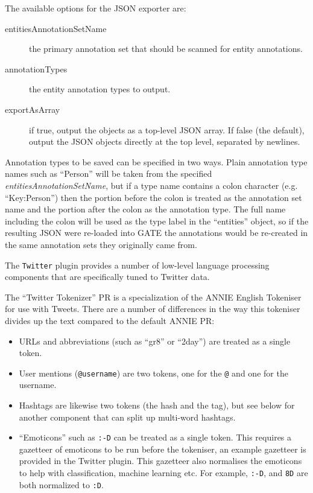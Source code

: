 The available options for the JSON exporter are:
\begin{description}
\item[entitiesAnnotationSetName] the primary annotation set that should be
  scanned for entity annotations.
\item[annotationTypes] the entity annotation types to output.
\item[exportAsArray] if true, output the objects as a top-level JSON array.  If
  false (the default), output the JSON objects directly at the top level,
  separated by newlines.
\end{description}

Annotation types to be saved can be specified in two ways.  Plain annotation
type names such as ``Person'' will be taken from the specified
\emph{entitiesAnnotationSetName}, but if a type name contains a colon character
(e.g. ``Key:Person'') then the portion before the colon is treated as the
annotation set name and the portion after the colon as the annotation type.
The full name including the colon will be used as the type label in the
``entities'' object, so if the resulting JSON were re-loaded into GATE the
annotations would be re-created in the same annotation sets they originally
came from.


The \verb!Twitter! plugin provides a number of low-level language processing
components that are specifically tuned to Twitter data.

The ``Twitter Tokenizer'' PR is a specialization of the ANNIE English Tokeniser
for use with Tweets.  There are a number of differences in the way this
tokeniser divides up the text compared to the default ANNIE PR:
%
\begin{itemize}
\item URLs and abbreviations (such as ``gr8'' or ``2day'') are treated as a
  single token.
\item User mentions (\verb!@username!) are two tokens, one for the \verb!@! and
  one for the username.
\item Hashtags are likewise two tokens (the hash and the tag), but see below
  for another component that can split up multi-word hashtags.
\item ``Emoticons'' such as \verb!:-D! can be treated as a single token.  This
  requires a gazetteer of emoticons to be run before the tokeniser, an example
  gazetteer is provided in the Twitter plugin. This gazetteer also normalises
  the emoticons to help with classification, machine learning etc. For example,
  \verb!:-D!, and \verb!8D! are both normalized to \verb!:D!.
\end{itemize}

